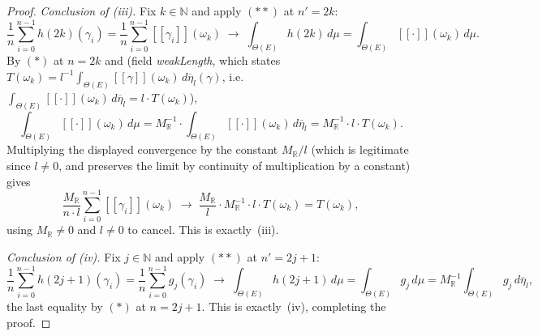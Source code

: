 \begin{proof}
  \emph{Conclusion of (iii).} Fix $k \in \mathbb{N}$ and apply $(\ast\ast)$ at $n' = 2k$:
  \[
    \frac{1}{n}\sum_{i=0}^{n-1} h(2k)(\gamma_i)
    = \frac{1}{n}\sum_{i=0}^{n-1} [[\gamma_i]](\omega_k)
    \;\longrightarrow\; \int_{\Theta(E)} h(2k)\,d\mu = \int_{\Theta(E)} [[\cdot]](\omega_k)\,d\mu
    .
  \]
  By $(\ast)$ at $n=2k$ and  (field \emph{weakLength}, which states
  $T(\omega_k) = l^{-1}\int_{\Theta(E)} [[\gamma]](\omega_k)\,d\overline\eta_l(\gamma)$, i.e.
  $\int_{\Theta(E)} [[\cdot]](\omega_k)\,d\overline\eta_l = l \cdot T(\omega_k)$),
  \[
    \int_{\Theta(E)} [[\cdot]](\omega_k)\,d\mu
    = M_{\mathbb R}^{-1} \cdot \int_{\Theta(E)} [[\cdot]](\omega_k)\,d\overline\eta_l
    = M_{\mathbb R}^{-1} \cdot l \cdot T(\omega_k)
    .
  \]
  Multiplying the displayed convergence by the constant $M_{\mathbb R}/l$ (which is legitimate
  since $l\ne0$, and preserves the limit by continuity of multiplication by a constant) gives
  \[
    \frac{M_{\mathbb R}}{n\cdot l}\sum_{i=0}^{n-1} [[\gamma_i]](\omega_k)
    \;\longrightarrow\;
    \frac{M_{\mathbb R}}{l}\cdot M_{\mathbb R}^{-1}\cdot l \cdot T(\omega_k)
    = T(\omega_k)
    ,
  \]
  using $M_{\mathbb R} \ne 0$ and $l \ne 0$ to cancel. This is exactly~(iii).

  \emph{Conclusion of (iv).} Fix $j \in \mathbb{N}$ and apply $(\ast\ast)$ at $n' = 2j+1$:
  \[
    \frac{1}{n}\sum_{i=0}^{n-1} h(2j+1)(\gamma_i) = \frac{1}{n}\sum_{i=0}^{n-1} g_j(\gamma_i)
    \;\longrightarrow\; \int_{\Theta(E)} h(2j+1)\,d\mu = \int_{\Theta(E)} g_j\,d\mu
    = M_{\mathbb R}^{-1}\int_{\Theta(E)} g_j\,d\overline\eta_l
    ,
  \]
  the last equality by $(\ast)$ at $n=2j+1$. This is exactly~(iv), completing the proof.
\end{proof}
